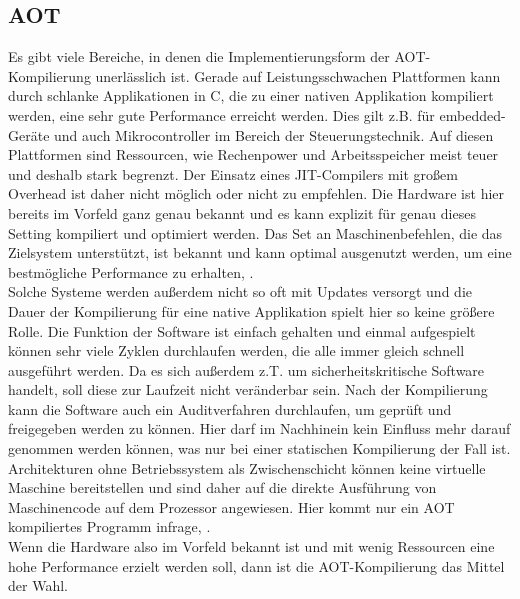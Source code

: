 \subsection{AOT}
Es gibt viele Bereiche, in denen die Implementierungsform der \ac{AOT}-Kompilierung unerlässlich ist. Gerade auf Leistungsschwachen Plattformen kann durch schlanke Applikationen in C, die zu einer nativen Applikation kompiliert werden, eine sehr gute Performance erreicht werden. Dies gilt z.B. für embedded-Geräte und auch Mikrocontroller im Bereich der Steuerungstechnik. Auf diesen Plattformen sind Ressourcen, wie Rechenpower und Arbeitsspeicher meist teuer und deshalb stark begrenzt. Der Einsatz eines \ac{JIT}-Compilers mit großem Overhead ist daher nicht möglich oder nicht zu empfehlen. Die Hardware ist hier bereits im Vorfeld ganz genau bekannt und es kann explizit für genau dieses Setting kompiliert und optimiert werden. Das Set an Maschinenbefehlen, die das Zielsystem unterstützt, ist bekannt und kann optimal ausgenutzt werden, um eine bestmögliche Performance zu erhalten, \cite[vgl. Louis 2016]{louis_2016}. \\
Solche Systeme werden außerdem nicht so oft mit Updates versorgt und die Dauer der Kompilierung für eine native Applikation spielt hier so keine größere Rolle. Die Funktion der Software ist einfach gehalten und einmal aufgespielt können sehr viele Zyklen durchlaufen werden, die alle immer gleich schnell ausgeführt werden. Da es sich außerdem z.T. um sicherheitskritische Software handelt, soll diese zur Laufzeit nicht veränderbar sein. Nach der Kompilierung kann die Software auch ein Auditverfahren durchlaufen, um geprüft und freigegeben werden zu können. Hier darf im Nachhinein kein Einfluss mehr darauf genommen werden können, was nur bei einer statischen Kompilierung der Fall ist.\\
Architekturen ohne Betriebssystem als Zwischenschicht können keine virtuelle Maschine bereitstellen und sind daher auf die direkte Ausführung von Maschinencode auf dem Prozessor angewiesen. Hier kommt nur ein \ac{AOT} kompiliertes Programm infrage, \cite[vgl. Louis 2016]{louis_2016}.\\
Wenn die Hardware also im Vorfeld bekannt ist und mit wenig Ressourcen eine hohe Performance erzielt werden soll, dann ist die \ac{AOT}-Kompilierung das Mittel der Wahl.

